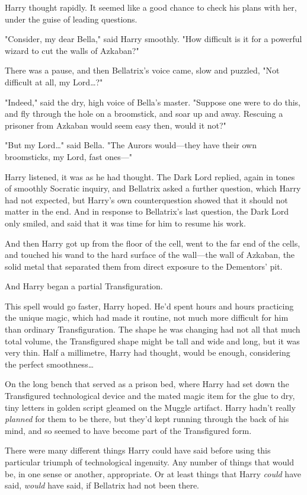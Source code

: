 Harry thought rapidly. It seemed like a good chance to check his plans with
her, under the guise of leading questions.

"Consider, my dear Bella," said Harry smoothly. "How difficult is it for a
powerful wizard to cut the walls of Azkaban?"

There was a pause, and then Bellatrix's voice came, slow and puzzled, "Not
difficult at all, my Lord…?"

"Indeed," said the dry, high voice of Bella's master. "Suppose one were to do
this, and fly through the hole on a broomstick, and soar up and away. Rescuing
a prisoner from Azkaban would seem easy then, would it not?"

"But my Lord…" said Bella. "The Aurors would---they have their own
broomsticks, my Lord, fast ones---"

Harry listened, it was as he had thought. The Dark Lord replied, again in tones
of smoothly Socratic inquiry, and Bellatrix asked a further question, which
Harry had not expected, but Harry's own counterquestion showed that it should
not matter in the end. And in response to Bellatrix's last question, the Dark
Lord only smiled, and said that it was time for him to resume his work.

And then Harry got up from the floor of the cell, went to the far end of the
cells, and touched his wand to the hard surface of the wall---the wall of
Azkaban, the solid metal that separated them from direct exposure to the
Dementors' pit.

And Harry began a partial Transfiguration.

This spell would go faster, Harry hoped. He'd spent hours and hours practicing
the unique magic, which had made it routine, not much more difficult for him
than ordinary Transfiguration. The shape he was changing had not all that much
total volume, the Transfigured shape might be tall and wide and long, but it
was very thin. Half a millimetre, Harry had thought, would be enough,
considering the perfect smoothness…

On the long bench that served as a prison bed, where Harry had set down the
Transfigured technological device and the mated magic item for the glue to dry,
tiny letters in golden script gleamed on the Muggle artifact. Harry hadn't
really \emph{planned} for them to be there, but they'd kept running through the
back of his mind, and so seemed to have become part of the Transfigured form.

There were many different things Harry could have said before using this
particular triumph of technological ingenuity. Any number of things that would
be, in one sense or another, appropriate. Or at least things that Harry
\emph{could} have said, \emph{would} have said, if Bellatrix had not been there.

